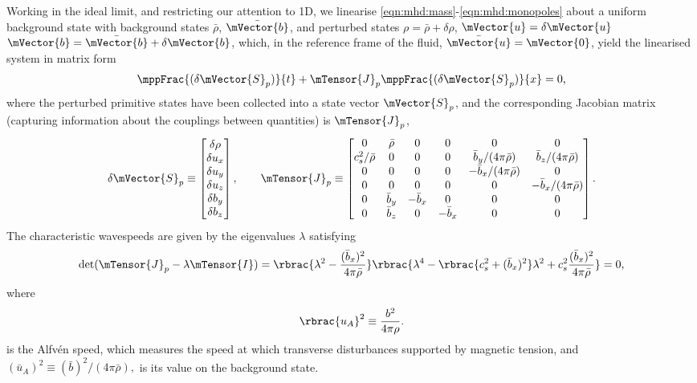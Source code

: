 Working in the ideal limit, and restricting our attention to 1D, we linearise \autoref{eqn:mhd:mass}-\ref{eqn:mhd:monopoles} about a uniform background state with background states \(\bar{\rho}\), \(\bar{\mVector{b}}\), and perturbed states \(\rho = \bar{\rho} + \delta{\rho}\), \(\mVector{u} = \delta{\mVector{u}}\) \(\mVector{b} = \bar{\mVector{b}} + \delta{\mVector{b}}\), which, in the reference frame of the fluid, \(\bar{\mVector{u}} = \mVector{0}\), yield the linearised system in matrix form
\begin{align}
    \mppFrac{(\delta{\mVector{S}_p})}{t}
        + \mTensor{J}_p \mppFrac{(\delta{\mVector{S}_p})}{x}
        = 0,
\end{align}
where the perturbed primitive states have been collected into a state vector \(\mVector{S}_p\), and the corresponding Jacobian matrix (capturing information about the couplings between quantities) is \(\mTensor{J}_p\),
\begin{align}
    \delta{\mVector{S}_p}
        \equiv \begin{bmatrix}
            \delta{\rho} \\
            \delta{u_x} \\
            \delta{u_y} \\
            \delta{u_z} \\
            \delta{b_y} \\
            \delta{b_z}
        \end{bmatrix}
    , \qquad
    \mTensor{J}_p
        \equiv \begin{bmatrix}
            0 & \bar{\rho} & 0 & 0 & 0 & 0 \\
            c_s^2 / \bar{\rho} & 0 & 0 & 0 & \bar{b}_y / (4\pi\bar{\rho}) & \bar{b}_z / (4\pi\bar{\rho}) \\
            0 & 0 & 0 & 0 & -\bar{b}_x / (4\pi\bar{\rho}) & 0 \\
            0 & 0 & 0 & 0 & 0 & -\bar{b}_x / (4\pi\bar{\rho}) \\
            0 & \bar{b}_y & -\bar{b}_x & 0 & 0 & 0 \\
            0 & \bar{b}_z & 0 & -\bar{b}_x & 0 & 0
        \end{bmatrix}.
\end{align}
The characteristic wavespeeds are given by the eigenvalues \(\lambda\) satisfying
\begin{align}
    \det(\mTensor{J}_p - \lambda\mTensor{I})
        = \rbrac{\lambda^2 - \frac{(\bar{b}_x)^2}{4\pi\bar{\rho}}} \rbrac{
            \lambda^4
            - \rbrac{c_s^2 + (\bar{b}_x)^2} \lambda^2
            + c_s^2\frac{(\bar{b}_x)^2}{4\pi\bar{\rho}}
        }
        = 0
        , \label{eqn:mhd-system:characteristics}
\end{align}
where
\begin{align}
    \rbrac{u_A}^2
        \equiv \frac{b^2}{4\pi\rho}.
\end{align}
is the Alfv\'en speed, which measures the speed at which transverse disturbances supported by magnetic tension, and \((\bar{u}_A)^2 \equiv (\bar{b})^2 / (4\pi\bar{\rho}),\) is its value on the background state.

